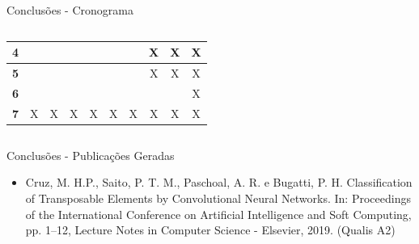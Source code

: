 \documentclass[%
  xcolor=table,%
  10pt,%
  aspectratio = 169,%
  compress,%
  t,%
]{beamer}%
\begin{document}
\begin{frame}{}{Conclusões - Cronograma}
\begin{columns}
\begin{column}{0.5\textwidth}
\begin{table}[H]
{\begin{tabular}{|c|c|c|c|c|c|c|c|c|c|}
                    \textbf{4}                                &               &               &               &               &                &                & X              & X             & X             \\ \hline
                    \textbf{5}                                &               &               &               &               &                &                & X              & X             & X             \\ \hline
                    \textbf{6}                                &               &               &               &               &                &                &                &               & X             \\ \hline
                    \textbf{7}                                & X             & X             & X             & X             & X              & X              & X              & X             & X             \\ \hline
                \end{tabular}}
            \end{table}
        \end{column}
    \end{columns}
\end{frame}

\begin{frame}{}{Conclusões - Publicações Geradas}
    \begin{itemize}
        \item Cruz, M. H.P., Saito, P. T. M., Paschoal, A. R. e Bugatti, P. H. Classification of Transposable Elements by Convolutional Neural Networks. In: Proceedings of the International Conference on Artificial Intelligence and Soft Computing, pp. 1--12, Lecture Notes in Computer Science - Elsevier, 2019. (Qualis A2)
    \end{itemize}
\end{frame}


\end{document}
